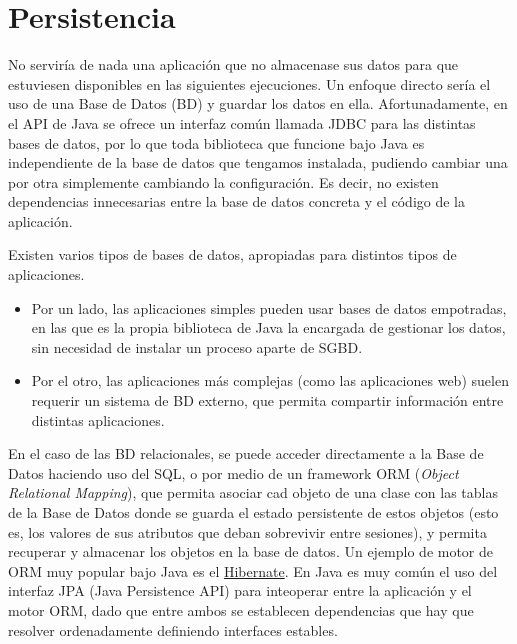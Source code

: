 \documentclass[11pt]{article}
\begin{document}
\section{Persistencia} \label{sec-6}
\label{librerias}

No serviría de nada una aplicación que no almacenase sus datos para que
estuviesen disponibles en las siguientes ejecuciones. Un enfoque directo sería el uso de una Base de Datos (BD) y guardar los datos
en ella. Afortunadamente, en el API de Java se ofrece un interfaz común llamada JDBC para
las distintas bases de datos, por lo que toda biblioteca que funcione bajo Java
es independiente de la base de datos que tengamos instalada, pudiendo cambiar
una por otra simplemente cambiando la configuración. Es decir, no existen
dependencias innecesarias entre la base de datos concreta y el código de la
aplicación.


Existen varios tipos de bases de datos, apropiadas para distintos tipos de aplicaciones. 

\begin{itemize}

\item Por un lado, las aplicaciones simples pueden usar bases de
datos empotradas, en las que es la propia biblioteca de Java la encargada de
gestionar los datos, sin necesidad de instalar un proceso aparte de SGBD.

\item Por el otro, las aplicaciones más complejas (como las aplicaciones web) suelen requerir un sistema
de BD externo, que permita compartir información entre distintas aplicaciones.

\end{itemize}

En el caso de las BD relacionales, se puede acceder directamente a la Base de Datos
haciendo uso del SQL, o por medio de un framework ORM (\emph{Object Relational Mapping}), que permita asociar
cad objeto de una clase con las tablas de la Base de Datos donde se guarda el estado persistente de estos objetos (esto es, los valores de sus atributos que deban sobrevivir entre sesiones), y permita recuperar y almacenar los objetos en la base de datos. Un ejemplo de motor de ORM muy popular bajo Java es el
\href{http://hibernate.org}{Hibernate}. En Java es muy común el uso del interfaz JPA (Java Persistence API) para inteoperar entre la aplicación y el motor ORM, dado que entre ambos se establecen dependencias que hay que resolver ordenadamente definiendo interfaces estables.
\end{document}
